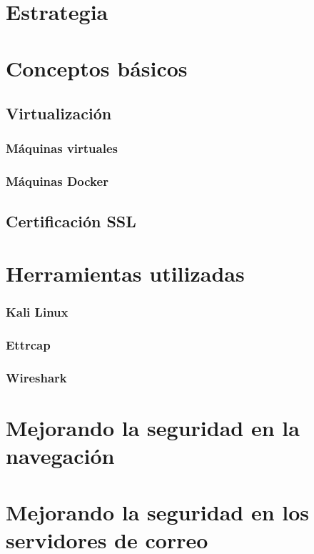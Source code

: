

\section{Estrategia}
\section{Conceptos básicos}
    \subsection{Virtualización}
    \subsubsection{Máquinas virtuales}
    \subsubsection{Máquinas Docker}
    \subsection{Certificación SSL}
\section{Herramientas utilizadas}
    \subsubsection{Kali Linux}
    \subsubsection{Ettrcap}
    \subsubsection{Wireshark}
\section{Mejorando la seguridad en la navegación}
\section{Mejorando la seguridad en los servidores de correo}






